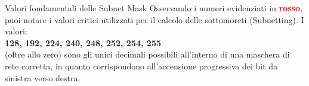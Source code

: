 \documentclass[a4paper,12pt]{report}
\begin{document}
\vspace{0.5cm} %
\begin{notebox}{Valori fondamentali delle Subnet Mask}
Osservando i numeri evidenziati in \textbf{\textcolor{red}{rosso}}, puoi notare i valori critici utilizzati per il calcolo delle sottomoreti (Subnetting). I valori: \\
\textbf{128, 192, 224, 240, 248, 252, 254, 255} \\
(oltre allo zero) sono gli unici decimali possibili all'interno di una maschera di rete corretta, in quanto corrispondono all'accensione progressiva dei bit da sinistra verso destra.
\end{notebox}
\end{document}
